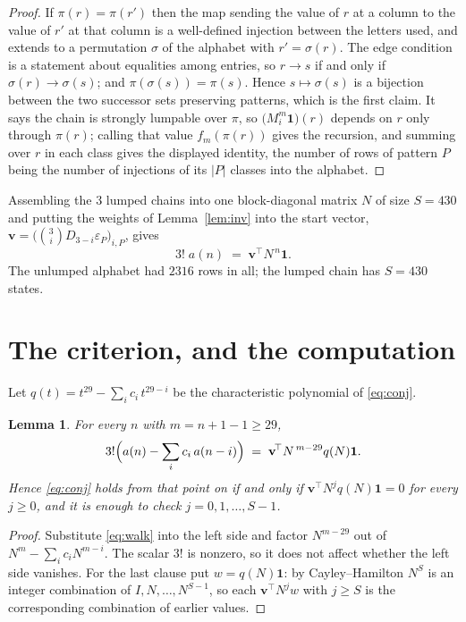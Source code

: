 \documentclass[11pt,a4paper]{article}
\theoremstyle{plain}
\newtheorem{lemma}[theorem]{Lemma}
\theoremstyle{definition}
\begin{document}
\begin{proof}
If $\pi(r)=\pi(r')$ then the map sending the value of $r$ at a column to the value of $r'$
at that column is a well-defined injection between the letters used, and extends to a
permutation $\sigma$ of the alphabet with $r'=\sigma(r)$. The edge condition is a statement
about equalities among entries, so $r\to s$ if and only if $\sigma(r)\to\sigma(s)$; and
$\pi(\sigma(s))=\pi(s)$. Hence $s\mapsto\sigma(s)$ is a bijection between the two successor
sets preserving patterns, which is the first claim. It says the chain is strongly lumpable
over $\pi$, so $\bigl(M_i^{m}\mathbf{1}\bigr)(r)$ depends on $r$ only through $\pi(r)$;
calling that value $f_m(\pi(r))$ gives the recursion, and summing over $r$ in each class
gives the displayed identity, the number of rows of pattern $P$ being the number of
injections of its $|P|$ classes into the alphabet.
\end{proof}

Assembling the $3$ lumped chains into one block-diagonal matrix $N$ of size $S=430$ and
putting the weights of Lemma~\ref{lem:inv} into the start vector,
$\mathbf{v}=\bigl(\binom{3}{i}D_{3-i}\varepsilon_P\bigr)_{i,P}$, gives
\begin{equation}\label{eq:walk}
3!\;a(n)\;=\;\mathbf{v}^{\!\top}N^{\,n}\mathbf{1} .
\end{equation}
The unlumped alphabet had $2316$ rows in all; the lumped chain has $S=430$ states.

\section{The criterion, and the computation}

Let $q(t)=t^{29}-\sum_i c_i\,t^{29-i}$ be the characteristic polynomial of
\eqref{eq:conj}.

\begin{lemma}\label{lem:crit}
For every $n$ with $m=n+1-1\ge29$,
\[
3!\Bigl(a(n)-\sum_i c_i\,a(n-i)\Bigr)\;=\;\mathbf{v}^{\!\top}N^{\,m-29}q(N)\mathbf{1} .
\]
Hence \eqref{eq:conj} holds from that point on if and only if
$\mathbf{v}^{\!\top}N^{j}q(N)\mathbf{1}=0$ for every $j\ge0$, and it is enough to check
$j=0,1,\dots,S-1$.
\end{lemma}

\begin{proof}
Substitute \eqref{eq:walk} into the left side and factor $N^{m-29}$ out of
$N^{m}-\sum_i c_iN^{m-i}$. The scalar $3!$ is nonzero, so it does not affect whether
the left side vanishes. For the last clause put $w=q(N)\mathbf{1}$: by Cayley--Hamilton
$N^{S}$ is an integer combination of $I,N,\dots,N^{S-1}$, so each
$\mathbf{v}^{\!\top}N^{j}w$ with $j\ge S$ is the corresponding combination of earlier
values.
\end{proof}
\end{document}

